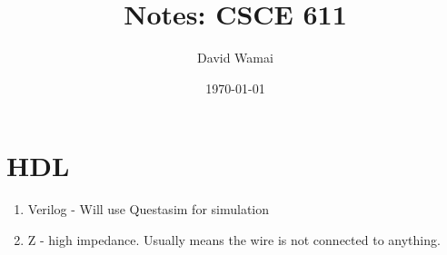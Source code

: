 \documentclass[a4paper]{article}
\title{Notes: CSCE 611}
\author{David Wamai}
\date{\today}
\begin{document}
\maketitle

\section{HDL}
\begin{enumerate}
  \item Verilog - Will use Questasim for simulation
  \item Z - high impedance. Usually means the wire is not connected to anything.

\end{enumerate}

  
\end{document}
